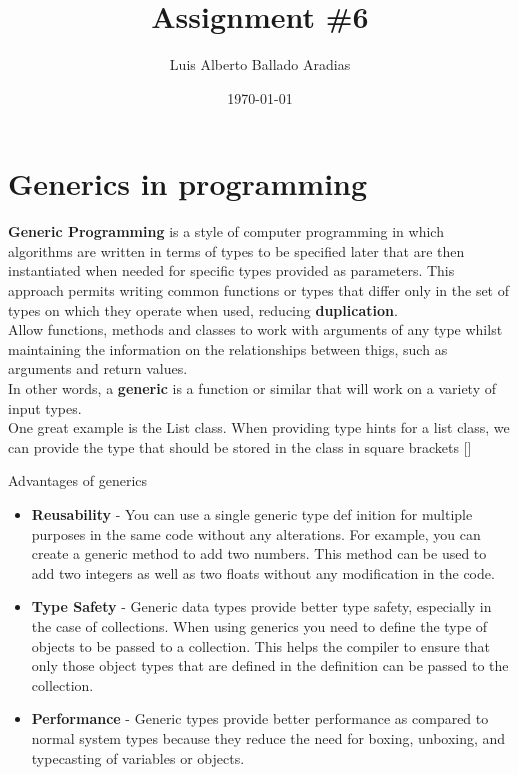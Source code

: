 \documentclass[
	12pt, %
]{fphw}
\title{Assignment \#6} %
\author{Luis Alberto Ballado Aradias} %
\date{\today} %
\institute{Centro de Investigación y de Estudios Avanzados del IPN \\ Unidad Tamaulipas} %
\begin{document}
\maketitle %


\section*{{\color{Apricot}Generics in programming}}


\textbf{Generic Programming} is a style of computer programming in which algorithms are written in terms of types to be specified later that are then instantiated when needed for specific types provided as parameters. This approach permits writing common functions or types that differ only in the set of types on which they operate when used, reducing \textbf{duplication}.\\

Allow functions, methods and classes to work with arguments of any type whilst maintaining the information on the relationships between thigs, such as arguments and return values.\\

In other words, a \textbf{generic} is a function or similar that will work on a variety of input types.\\

One great example is the List class. When providing type hints for a list class, we can provide the type that should be stored in the class in square brackets []

Advantages of generics

\begin{itemize}
\item \textbf{Reusability} - You can use a single generic type def	inition for multiple purposes in the same code without any alterations. For example, you can create a generic method to add two numbers. This method can be used to add two integers as well as two floats without any modification in the code.
\item \textbf{Type Safety} - Generic data types provide better type safety, especially in the case of collections. When using generics you need to define the type of objects to be passed to a collection. This helps the compiler to ensure that only those object types that are defined in the definition can be passed to the collection.
\item \textbf{Performance} - Generic types provide better performance as compared to normal system types because they reduce the need for boxing, unboxing, and typecasting of variables or objects. 
\end{itemize}
\end{document}
